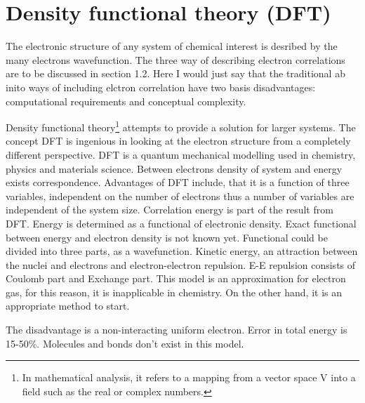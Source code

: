 \documentclass[
  digital, %
  table,   %
  lof,     %
  lot,     %
]{fithesis3}
\begin{document}
\section{Density functional theory (DFT)}
The electronic structure of any system of chemical interest is desribed by the many electrons wavefunction. The three way of describing electron correlations are to be discussed in section 1.2. Here I would just say that the traditional ab inito ways of including elctron correlation have two basis disadvantages: computational requirements and conceptual complexity.

Density functional theory\footnote{In mathematical analysis, it refers to a mapping from a vector space V into a field such as the real or complex numbers.} attempts to provide a solution for larger systems. The concept DFT is ingenious in looking at the electron structure from a completely different perspective.
 DFT is a quantum mechanical modelling used in chemistry, physics and materials science.  Between electrons density of system and energy exists correspondence. Advantages of DFT include, that it is a function of three variables, independent on the number of electrons thus a number of variables are independent of the system size.  Correlation energy is part of the result from DFT. Energy is determined as a functional of electronic density. Exact functional between energy and electron density is not known yet. Functional could be divided into three parts, as a wavefunction. Kinetic energy, an attraction between the nuclei and electrons and electron-electron repulsion. E-E repulsion consists of Coulomb part and Exchange part. This model is an approximation for electron gas, for this reason, it is inapplicable in chemistry. On the other hand, it is an appropriate method to start.

The disadvantage is a non-interacting uniform electron. Error in total energy is 15-50\%. Molecules and bonds don't exist in this model.\cite{jensen2007introduction}
\end{document}
